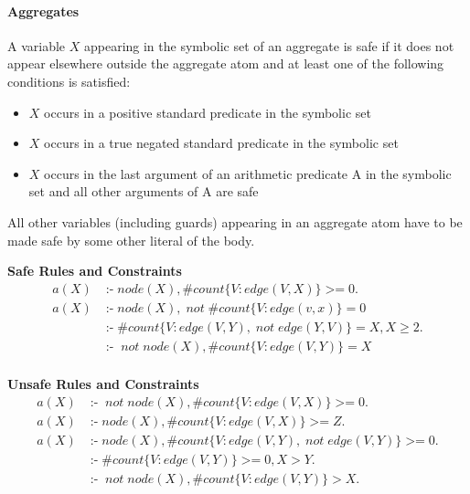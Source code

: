 \documentclass[a4paper, titlepage]{article}
\DeclareMathOperator{\leftimpl}{:-}
\DeclareMathOperator{\nott}{\mathit{not}}
\DeclareMathOperator{\geeq}{>=}
\begin{document}
\paragraph{Aggregates}
A variable $X$ appearing in the symbolic set of an aggregate is safe if it does not appear elsewhere outside the aggregate atom and at least one of the following conditions is satisfied:
\begin{itemize}
\item $X$ occurs in a positive standard predicate in the symbolic set
\item $X$ occurs in a true negated standard predicate in the symbolic set
\item $X$ occurs in the last argument of an arithmetic predicate A in the symbolic set and all other arguments of A are safe
\end{itemize}
All other variables (including guards) appearing in an aggregate atom have to be made safe by some other literal of the body.
\begin{exmp} \textbf{Safe Rules and Constraints}
\begin{align*}
a(X) & \leftimpl node(X), \#count\{ V \colon edge(V,X)\} \geeq 0. \\
a(X) & \leftimpl node(X), \nott \#count\{ V \colon edge(v,x)\} = 0\\
& \leftimpl \#count\{V \colon edge(V,Y), \nott edge(Y,V)\}=X, X\geq2.\\
& \leftimpl \nott node(X), \#count\{ V \colon edge(V,Y)\}=X\\
\end{align*}
\end{exmp}

\begin{exmp} \textbf{Unsafe Rules and Constraints}
\begin{align*}
a(X) & \leftimpl \nott node(X), \#count\{V \colon edge(V,X)\} \geeq 0. \\
a(X) & \leftimpl node(X), \#count\{V \colon edge(V,X)\} \geeq Z. \\
a(X) & \leftimpl node(X), \#count\{V \colon edge(V,Y), \nott edge(V,Y)\} \geeq 0. \\
& \leftimpl \#count\{ V \colon edge(V,Y)\} \geeq 0, X > Y. \\
& \leftimpl \nott node(X), \#count\{V \colon edge(V,Y)\} > X. 
\end{align*}
\end{exmp}
\end{document}
